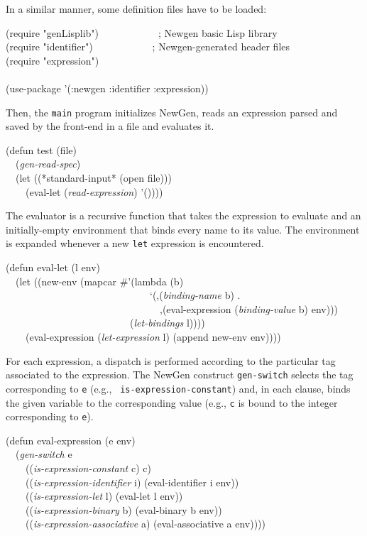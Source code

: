 In a similar manner, some definition files have to be loaded:
\begin{pgm}
(require "genLisplib")~~~~~~~~~~~~; Newgen basic Lisp library \\
(require "identifier")~~~~~~~~~~~~; Newgen-generated header files \\
(require "expression") \\
 \\
(use-package '(:newgen :identifier :expression))
\end{pgm}
Then, the {\tt main} program initializes NewGen, reads an expression
parsed and saved by the front-end in a file and evaluates it.
\begin{pgm}
(defun test (file) \\
~~({\sl gen-read-spec}) \\
~~(let ((*standard-input* (open file))) \\
~~~~(eval-let ({\sl read-expression}) '())))
\end{pgm}
The evaluator is a recursive function that takes the expression to
evaluate and an initially-empty environment that binds every name to its
value. The environment is expanded whenever a new {\tt let} expression
is encountered.
\begin{pgm}
(defun eval-let (l env) \\
~~(let ((new-env (mapcar \#'(lambda (b) \\
~~~~~~~~~~~~~~~~~~~~~~~~~~~~~`(,({\sl binding-name} b) . \\
~~~~~~~~~~~~~~~~~~~~~~~~~~~~~~~,(eval-expression ({\sl binding-value} b) env))) \\
~~~~~~~~~~~~~~~~~~~~~~~~~({\sl let-bindings} l)))) \\
~~~~(eval-expression ({\sl let-expression} l) (append new-env env)))) 
\end{pgm}
For each expression, a dispatch is performed according to the particular
tag associated to the expression. The NewGen construct {\tt gen-switch}
selects the tag corresponding to {\tt e} (e.g., {\tt
is-expression-constant}) and, in each clause, binds the given variable
to the corresponding value (e.g., {\tt c} is bound to the integer
corresponding to {\tt e}).
\begin{pgm}
(defun eval-expression (e env) \\
~~({\sl gen-switch} e \\
~~~~(({\sl is-expression-constant} c) c) \\
~~~~(({\sl is-expression-identifier} i) (eval-identifier i env)) \\
~~~~(({\sl is-expression-let} l) (eval-let l env)) \\
~~~~(({\sl is-expression-binary} b) (eval-binary b env)) \\
~~~~(({\sl is-expression-associative} a) (eval-associative a env)))) 
\end{pgm}
